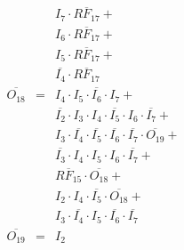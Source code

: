 \documentclass[a4paper,russian]{report}
\begin{document}
\begin{eqnarray*}
	& &  I_{7} \cdotp \overline{RF_{17}} + \\
	& &  I_{6} \cdotp \overline{RF_{17}} + \\
	& &  I_{5} \cdotp \overline{RF_{17}} + \\
	& &  \overline{I_{4}} \cdotp \overline{RF_{17}} \\
    \overline{O_{18}} & = & I_{4} \cdotp I_{5} \cdotp \overline{I_{6}} \cdotp I_{7} + \\
	& &  \overline{I_{2}} \cdotp I_{3} \cdotp I_{4} \cdotp \overline{I_{5}} \cdotp I_{6} \cdotp \overline{I_{7}} + \\
	& &  I_{3} \cdotp \overline{I_{4}} \cdotp \overline{I_{5}} \cdotp \overline{I_{6}} \cdotp \overline{I_{7}} \cdotp \overline{O_{19}} + \\
	& &  \overline{I_{3}} \cdotp I_{4} \cdotp I_{5} \cdotp I_{6} \cdotp \overline{I_{7}} + \\
	& &  \overline{RF_{15}} \cdotp \overline{O_{18}} + \\
	& &  I_{2} \cdotp I_{4} \cdotp \overline{I_{5}} \cdotp \overline{O_{18}} + \\
	& &  I_{3} \cdotp \overline{I_{4}} \cdotp I_{5} \cdotp \overline{I_{6}} \cdotp \overline{I_{7}} \\
    \overline{O_{19}} & = & I_{2} \\
 \end{eqnarray*}
\pagebreak[1]
\end{document}
